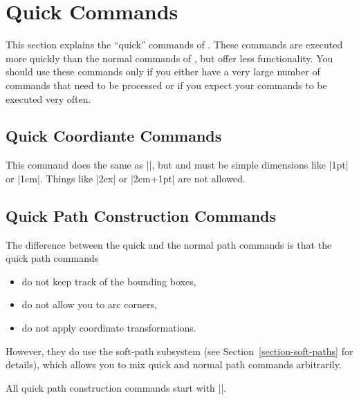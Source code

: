 %


\section{Quick Commands}

This section explains the ``quick'' commands of \pgfname. These
commands are executed more quickly than the normal commands of
\pgfname, but offer less functionality. You should use these commands
only if you either have a very large number of commands that need to
be processed or if you expect your commands to be executed very often.


\subsection{Quick Coordiante Commands}

\begin{command}{\pgfqpoint{}}
  This command does the same as |\pgfpoint|, but  and 
  must be simple dimensions like |1pt| or |1cm|. Things like |2ex| or
  |2cm+1pt| are not allowed.
\end{command}

\subsection{Quick Path Construction Commands}

The difference between the quick and the normal path commands is that
the quick path commands
\begin{itemize}
\item
  do not keep track of the bounding boxes,
\item
  do not allow you to arc corners,
\item
  do not apply coordinate transformations.
\end{itemize}

However, they do use the soft-path subsystem (see
Section~\ref{section-soft-paths} for details), which allows you to mix
quick and normal path commands arbitrarily.

All quick path construction commands start with |\pgfpathq|.

